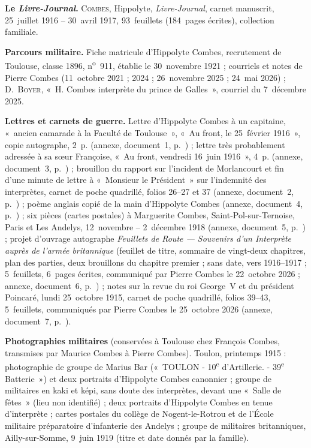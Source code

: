 \begin{biblist}
\item \textbf{Le \textit{Livre-Journal}.} \textsc{Combes}, Hippolyte, \textit{Livre-Journal}, carnet manuscrit, 25~juillet 1916 -- 30~avril 1917, 93~feuillets (184~pages écrites), collection familiale.
\item \textbf{Parcours militaire.} Fiche matricule d'Hippolyte Combes, recrutement de Toulouse, classe 1896, n\textsuperscript{o}~911, établie le 30~novembre 1921 ; courriels et notes de Pierre Combes (11~octobre 2021 ; 2024 ; 26~novembre 2025 ; 24~mai 2026) ; D.~\textsc{Boyer}, «~H. Combes interprète du prince de Galles~», courriel du 7~décembre 2025.
\item \textbf{Lettres et carnets de guerre.} Lettre d'Hippolyte Combes à un capitaine, «~ancien camarade à la Faculté de Toulouse~», «~Au front, le 25~février 1916~», copie autographe, 2~p. (annexe, document~1, p.~\pageref{annexe:doc1}) ; lettre très probablement adressée à sa sœur Françoise, «~Au front, vendredi 16~juin 1916~», 4~p. (annexe, document~3, p.~\pageref{annexe:doc3}) ; brouillon du rapport sur l'incident de Morlancourt et fin d'une minute de lettre à «~Monsieur le Président~» sur l'indemnité des interprètes, carnet de poche quadrillé, folios 26--27 et 37 (annexe, document~2, p.~\pageref{annexe:doc2}) ; poème anglais copié de la main d'Hippolyte Combes (annexe, document~4, p.~\pageref{annexe:doc4}) ; six pièces (cartes postales) à Marguerite Combes, Saint-Pol-sur-Ternoise, Paris et Les Andelys, 12~novembre -- 2~décembre 1918 (annexe, document~5, p.~\pageref{annexe:doc5}) ; projet d'ouvrage autographe \textit{Feuillets de Route — Souvenirs d'un Interprète auprès de l'armée britannique} (feuillet de titre, sommaire de vingt-deux chapitres, plan des parties, deux brouillons du chapitre premier ; sans date, vers 1916--1917 ; 5~feuillets, 6~pages écrites, communiqué par Pierre Combes le 22~octobre 2026 ; annexe, document~6, p.~\pageref{annexe:doc6}) ; notes sur la revue du roi George~V et du président Poincaré, lundi 25~octobre 1915, carnet de poche quadrillé, folios 39--43, 5~feuillets, communiqués par Pierre Combes le 25~octobre 2026 (annexe, document~7, p.~\pageref{annexe:doc7}).
\item \textbf{Photographies militaires} (conservées à Toulouse chez François Combes, transmises par Maurice Combes à Pierre Combes). Toulon, printemps 1915 : photographie de groupe de Marius Bar («~TOULON - 10\textsuperscript{e} d'Artillerie. - 39\textsuperscript{e} Batterie~») et deux portraits d'Hippolyte Combes canonnier ; groupe de militaires en kaki et képi, sans doute des interprètes, devant une «~Salle de fêtes~» (lieu non identifié) ; deux portraits d'Hippolyte Combes en tenue d'interprète ; cartes postales du collège de Nogent-le-Rotrou et de l'École militaire préparatoire d'infanterie des Andelys ; groupe de militaires britanniques, Ailly-sur-Somme, 9~juin 1919 (titre et date donnés par la famille).

\end{biblist}
